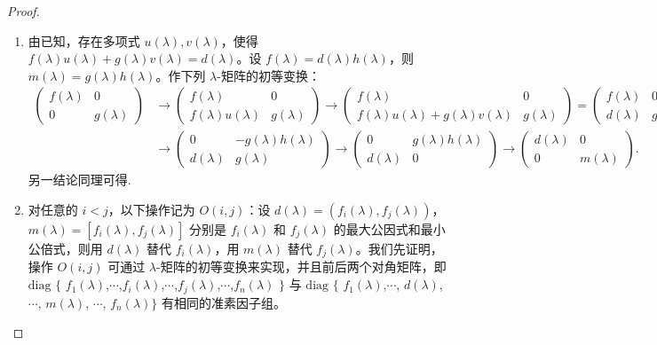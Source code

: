 \documentclass[../../main.tex]{subfiles}
\begin{document}
\begin{proof}
\begin{enumerate}[(1)]
\item 由已知，存在多项式 \(u(\lambda),v(\lambda)\)，使得 \(f(\lambda)u(\lambda)+g(\lambda)v(\lambda)=d(\lambda)\)。设 \(f(\lambda)=d(\lambda)h(\lambda)\)，则 \(m(\lambda)=g(\lambda)h(\lambda)\)。作下列 \(\lambda\)-矩阵的初等变换：
\begin{align*}
\begin{pmatrix}
f(\lambda) & 0 \\
0 & g(\lambda)
\end{pmatrix}&\to
\begin{pmatrix}
f(\lambda) & 0 \\
f(\lambda)u(\lambda) & g(\lambda)
\end{pmatrix}\to
\begin{pmatrix}
f(\lambda) & 0 \\
f(\lambda)u(\lambda)+g(\lambda)v(\lambda) & g(\lambda)
\end{pmatrix}
=
\begin{pmatrix}
f(\lambda) & 0 \\
d(\lambda) & g(\lambda)
\end{pmatrix}
\\
&\to
\begin{pmatrix}
0 & -g(\lambda)h(\lambda) \\
d(\lambda) & g(\lambda)
\end{pmatrix}\to
\begin{pmatrix}
0 & g(\lambda)h(\lambda) \\
d(\lambda) & 0
\end{pmatrix}\to
\begin{pmatrix}
d(\lambda) & 0 \\
0 & m(\lambda)
\end{pmatrix}.
\end{align*}
另一结论同理可得.

\item 对任意的 \(i < j\)，以下操作记为 \(O(i,j)\)：设 \(d(\lambda)=(f_i(\lambda),f_j(\lambda))\)，\(m(\lambda)=[f_i(\lambda),f_j(\lambda)]\) 分别是 \(f_i(\lambda)\) 和 \(f_j(\lambda)\) 的最大公因式和最小公倍式，则用 \(d(\lambda)\) 替代 \(f_i(\lambda)\)，用 \(m(\lambda)\) 替代 \(f_j(\lambda)\)。我们先证明，操作 \(O(i,j)\) 可通过 \(\lambda\)-矩阵的初等变换来实现，并且前后两个对角矩阵，即 $\mathrm{diag}$ $\{$ $f_1(\lambda)$,$\cdots$,$f_i(\lambda)$,$\cdots$,$f_j(\lambda)$,$\cdots$,$f_n(\lambda)$ $\}$ 与 $\mathrm{diag}$ $\{$ $f_1(\lambda)$,$\cdots$, $d(\lambda)$, $\cdots$, $m(\lambda)$, $\cdots$, $f_n(\lambda)\}$ 有相同的准素因子组。


\end{enumerate}
\end{proof}
\end{document}
